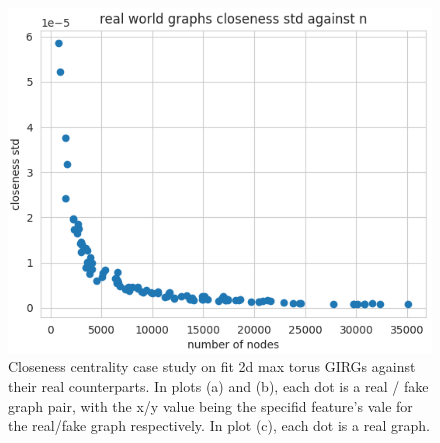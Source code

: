 \begin{figure}
    \parbox[b]{.5\textwidth}{\Large
    \includegraphics[width=0.9\linewidth]{./figures/real_fake_closeness_std_vs_number_of_nodes.png}
    }
    \hspace{.05\textwidth}%
    \parbox[b]{.4\textwidth}{%
    \caption{Closeness centrality case study on fit 2d max torus GIRGs against their real counterparts. In plots (a) and (b), each dot is a real / fake graph pair, with the x/y value being the specifid feature's vale for the real/fake graph respectively. In plot (c), each dot is a real graph.}}
\end{figure}

